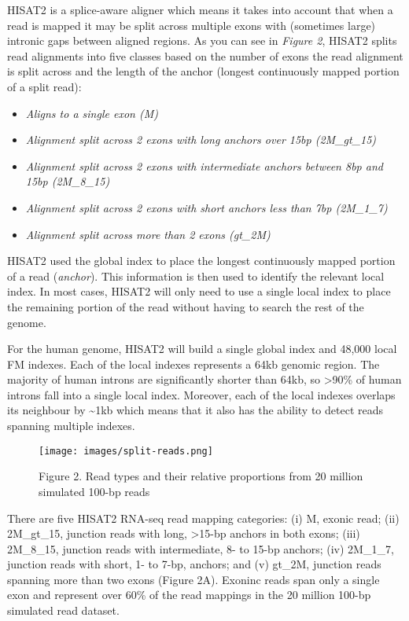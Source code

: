 \documentclass[11pt]{article}
\providecommand{\tightlist}{%
      \setlength{\itemsep}{0pt}\setlength{\parskip}{0pt}}
\begin{document}
HISAT2 is a splice-aware aligner which means it takes into account that
when a read is mapped it may be split across multiple exons with
(sometimes large) intronic gaps between aligned regions. As you can see
in \textit{Figure 2}, HISAT2 splits read alignments into five classes
based on the number of exons the read alignment is split across and the
length of the anchor (longest continuously mapped portion of a split
read):

\begin{itemize}
\tightlist
\item
  \textit{Aligns to a single exon (M)}
\item
  \textit{Alignment split across 2 exons with long anchors over 15bp
  (2M\_gt\_15)}
\item
  \textit{Alignment split across 2 exons with intermediate anchors between
  8bp and 15bp (2M\_8\_15)}
\item
  \textit{Alignment split across 2 exons with short anchors less than 7bp
  (2M\_1\_7)}
\item
  \textit{Alignment split across more than 2 exons (gt\_2M)}
\end{itemize}

HISAT2 used the global index to place the longest continuously mapped
portion of a read (\textit{anchor}). This information is then used to
identify the relevant local index. In most cases, HISAT2 will only need
to use a single local index to place the remaining portion of the read
without having to search the rest of the genome.

For the human genome, HISAT2 will build a single global index and 48,000
local FM indexes. Each of the local indexes represents a 64kb genomic
region. The majority of human introns are significantly shorter than
64kb, so \textgreater90\% of human introns fall into a single local
index. Moreover, each of the local indexes overlaps its neighbour by
\textasciitilde1kb which means that it also has the ability to detect
reads spanning multiple indexes.

    \begin{figure}[!h]
\centering
\texttt{[image: images/split-reads.png]}
\caption{Figure 2. Read types and their relative proportions from 20
million simulated 100-bp reads}
\end{figure}

    There are five HISAT2 RNA-seq read mapping categories: (i) M, exonic
read; (ii) 2M\_gt\_15, junction reads with long, \textgreater15-bp
anchors in both exons; (iii) 2M\_8\_15, junction reads with
intermediate, 8- to 15-bp anchors; (iv) 2M\_1\_7, junction reads with
short, 1- to 7-bp, anchors; and (v) gt\_2M, junction reads spanning more
than two exons (Figure 2A). Exoninc reads span only a single exon and
represent over 60\% of the read mappings in the 20 million 100-bp
simulated read dataset.
\end{document}
